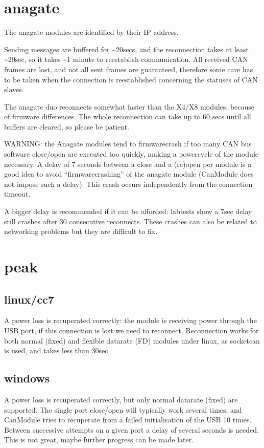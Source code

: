 \documentclass[a4paper,10pt,english]{sphinxmanual}
\begin{document}
\section{anagate}
\label{\detokenize{reconnection:anagate}}
The anagate modules are identified by their IP address.

Sending messages are buffered for \textasciitilde{}20secs, and the reconnection
takes at least \textasciitilde{}20sec, so it takes \textasciitilde{}1 minute to reestablish communication. All received CAN frames
are lost, and not all sent frames are guaranteed, therefore some care has to be taken when the
connection is reestablished concerning the statuses of CAN slaves.

The anagate duo reconnects somewhat faster than the X4/X8 modules, because of firmware differences.
The whole reconnection can take up to 60 secs until all buffers are cleared, so please be patient.

WARNING: the Anagate modules tend to firmware\sphinxhyphen{}crash if too many CAN bus software close/open are
executed too quickly, making a power\sphinxhyphen{}cycle of the module necessary. A delay of 7 seconds
between a close and a (re\sphinxhyphen{})open per module is a good idea to avoid
“firmware\sphinxhyphen{}crashing” of the anagate module (CanModule does not impose such a delay).
This crash occurs independently from the connection timeout.

A bigger delay is recommended if it can be afforded: lab\sphinxhyphen{}tests show a 7sec delay still crashes
after 30 consecutive reconnects. These crashes can also be related to networking problems but
they are difficult to fix.


\section{peak}
\label{\detokenize{reconnection:peak}}

\subsection{linux/cc7}
\label{\detokenize{reconnection:linux-cc7}}
A power loss is recuperated correctly: the module is receiving power through the USB port,
if this connection is lost we need to reconnect. Reconnection works for both normal (fixed)
and flexible datarate (FD) modules under linux, as socketcan is used, and takes less than 30sec.


\subsection{windows}
\label{\detokenize{reconnection:windows}}
A power loss is recuperated correctly, but only normal datarate (fixed) are supported.
The single port close/open will typically work several times, and CanModule tries to
recuperate from a failed initialisation of the USB 10 times. Between successive attempts on a
given port a delay of several seconds is needed. This is not great, maybe further progress
can be made later.
\end{document}

